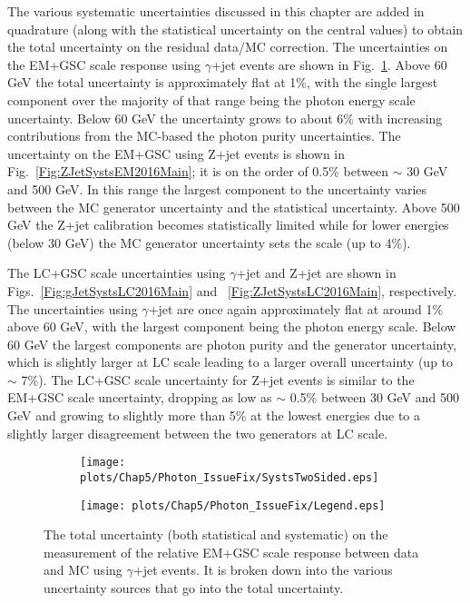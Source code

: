 The various systematic uncertainties discussed in this chapter are added in quadrature (along with the statistical uncertainty on the central values) to obtain the total uncertainty on the residual data/MC correction.  
The uncertainties on the EM+GSC scale response using $\gamma$+jet events are shown in Fig.~\ref{Fig:gJetSystsEM2016Main}.  
Above 60 GeV the total uncertainty is approximately flat at 1\%, with the single largest component over the majority of that range being the photon energy scale uncertainty.  
Below 60 GeV the uncertainty grows to about 6\% with increasing contributions from the MC-based the photon purity uncertainties.  
The uncertainty on the EM+GSC using Z+jet events is shown in Fig.~\ref{Fig:ZJetSystsEM2016Main}; it is on the order of 0.5\% between $\sim$ 30 GeV and 500 GeV.  
In this range the largest component to the uncertainty varies between the MC generator uncertainty and the statistical uncertainty.  
Above 500 GeV the Z+jet calibration becomes statistically limited while for lower energies (below 30 GeV) the MC generator uncertainty sets the scale (up to 4\%). 

The LC+GSC scale uncertainties using $\gamma$+jet and Z+jet are shown in Figs.~\ref{Fig:gJetSystsLC2016Main} and ~\ref{Fig:ZJetSystsLC2016Main}, respectively.  
The uncertainties using $\gamma$+jet are once again approximately flat at around 1\% above 60 GeV, with the largest component being the photon energy scale.  
Below 60 GeV the largest components are photon purity and the generator uncertainty, which is slightly larger at LC scale leading to a larger overall uncertainty (up to $\sim$ 7\%).  
The LC+GSC scale uncertainty for Z+jet events is similar to the EM+GSC scale uncertainty, dropping as low as $\sim$ 0.5\% between 30 GeV and 500 GeV and growing to slightly more than 5\% at the lowest energies due to a slightly larger disagreement between the two generators at LC scale.  

\begin{figure}[!ht]
\captionsetup[subfigure]{labelformat=empty}
 \begin{center}
   \begin{subfigure}{0.55\textwidth}
     \hspace{-3cm}
     \texttt{[image: plots/Chap5/Photon\_IssueFix/SystsTwoSided.eps]}
   \end{subfigure}
   \begin{subfigure}{0.55\textwidth}
     \hspace{-3cm}
     \texttt{[image: plots/Chap5/Photon\_IssueFix/Legend.eps]}
   \end{subfigure} 
 \end{center}
 \caption[Uncertainty on the EM+GSC scale response measurement using $\gamma$+jet]
 {\small The total uncertainty (both statistical and systematic) on the measurement of the relative EM+GSC scale response between data and MC using $\gamma$+jet events.  It is broken down into the various uncertainty sources that go into the total uncertainty.  }
 \label{Fig:gJetSystsEM2016Main}
\end{figure}


